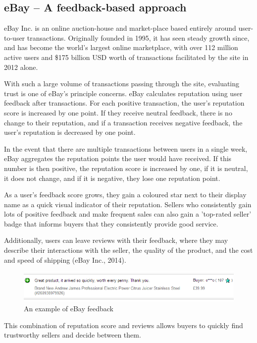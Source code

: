 \documentclass[]{final_report}
\begin{document}
\subsection{eBay -- A feedback-based approach}

eBay Inc. is an online auction-house and market-place based entirely around user-to-user transactions. Originally founded in 1995, it has seen steady growth since, and has become the world's largest online marketplace, with over 112 million active users and \$175 billion USD worth of transactions facilitated by the site in 2012 alone.

With such a large volume of transactions passing through the site, evaluating trust is one of eBay's principle concerns. eBay calculates reputation using user feedback after transactions. For each positive transaction, the user's reputation score is increased by one point. If they receive neutral feedback, there is no change to their reputation, and if a transaction receives negative feedback, the user's reputation is decreased by one point.

In the event that there are multiple transactions between users in a single week, eBay aggregates the reputation points the user would have received. If this number is then positive, the reputation score is increased by one, if it is neutral, it does not change, and if it is negative, they lose one reputation point.

As a user's feedback score grows, they gain a coloured star next to their display name as a quick visual indicator of their reputation. Sellers who consistently gain lots of positive feedback and make frequent sales can also gain a 'top-rated seller' badge that informs buyers that they consistently provide good service.

Additionally, users can leave reviews with their feedback, where they may describe their interactions with the seller, the quality of the product, and the cost and speed of shipping (eBay Inc., 2014).

\begin{figure}[ht!]
\centering
\includegraphics[width=140mm]{ebayfeedback.png}
\caption{An example of eBay feedback}
\end{figure}

This combination of reputation score and reviews allows buyers to quickly find trustworthy sellers and decide between them.
\end{document}
